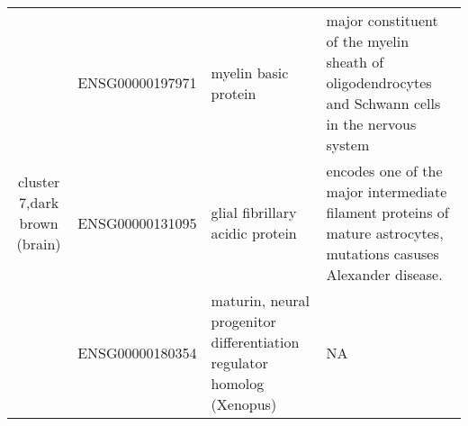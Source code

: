 \begin{table}
\begin{center}
\begin{tabular}{|c|c|p{1.9in}|p{2.5in}|}
 \hline
 \multirow{3}{4em}{cluster 7,dark brown (brain)} & ENSG00000197971 & myelin basic protein & major constituent of the myelin sheath of oligodendrocytes and Schwann cells in the nervous system\\
 					    & ENSG00000131095 & glial fibrillary acidic protein & encodes one of the major intermediate filament proteins of mature astrocytes, mutations casuses Alexander disease.\\
					    & ENSG00000180354 & maturin, neural progenitor differentiation regulator homolog (Xenopus) & NA \\
\hline	
 \end{tabular}
 \end{center}
\end{table}





